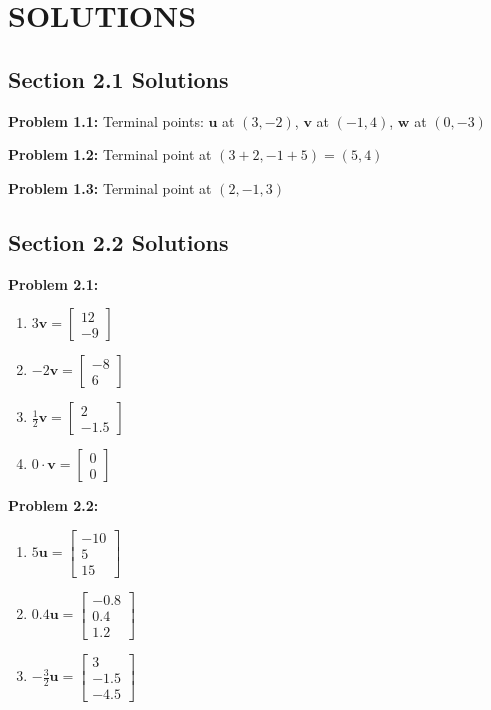 \documentclass{article}
\begin{document}
\newpage

\section{SOLUTIONS}

\subsection{Section 2.1 Solutions}

\textbf{Problem 1.1:}
Terminal points: $\mathbf{u}$ at $(3,-2)$, $\mathbf{v}$ at $(-1,4)$, $\mathbf{w}$ at $(0,-3)$

\textbf{Problem 1.2:}
Terminal point at $(3+2, -1+5) = (5,4)$

\textbf{Problem 1.3:}
Terminal point at $(2,-1,3)$

\subsection{Section 2.2 Solutions}

\textbf{Problem 2.1:}
\begin{enumerate}
\item $3\mathbf{v} = \begin{bmatrix} 12 \\ -9 \end{bmatrix}$
\item $-2\mathbf{v} = \begin{bmatrix} -8 \\ 6 \end{bmatrix}$
\item $\frac{1}{2}\mathbf{v} = \begin{bmatrix} 2 \\ -1.5 \end{bmatrix}$
\item $0 \cdot \mathbf{v} = \begin{bmatrix} 0 \\ 0 \end{bmatrix}$
\end{enumerate}

\textbf{Problem 2.2:}
\begin{enumerate}
\item $5\mathbf{u} = \begin{bmatrix} -10 \\ 5 \\ 15 \end{bmatrix}$
\item $0.4\mathbf{u} = \begin{bmatrix} -0.8 \\ 0.4 \\ 1.2 \end{bmatrix}$
\item $-\frac{3}{2}\mathbf{u} = \begin{bmatrix} 3 \\ -1.5 \\ -4.5 \end{bmatrix}$
\end{enumerate}
\end{document}
